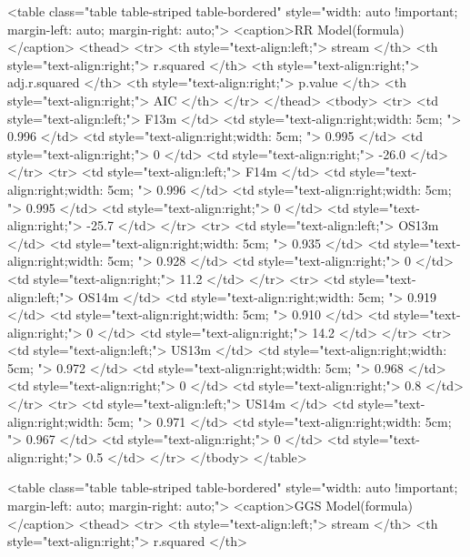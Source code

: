\documentclass[
]{article}
\begin{document}
\begin{table}[!htb]
    \begin{minipage}{.5\linewidth}
      \caption{}
      \centering <table class="table table-striped table-bordered" style="width: auto !important; margin-left: auto; margin-right: auto;">
<caption>RR Model(formula)</caption>
 <thead>
  <tr>
   <th style="text-align:left;"> stream </th>
   <th style="text-align:right;"> r.squared </th>
   <th style="text-align:right;"> adj.r.squared </th>
   <th style="text-align:right;"> p.value </th>
   <th style="text-align:right;"> AIC </th>
  </tr>
 </thead>
<tbody>
  <tr>
   <td style="text-align:left;"> F13m </td>
   <td style="text-align:right;width: 5cm; "> 0.996 </td>
   <td style="text-align:right;width: 5cm; "> 0.995 </td>
   <td style="text-align:right;"> 0 </td>
   <td style="text-align:right;"> -26.0 </td>
  </tr>
  <tr>
   <td style="text-align:left;"> F14m </td>
   <td style="text-align:right;width: 5cm; "> 0.996 </td>
   <td style="text-align:right;width: 5cm; "> 0.995 </td>
   <td style="text-align:right;"> 0 </td>
   <td style="text-align:right;"> -25.7 </td>
  </tr>
  <tr>
   <td style="text-align:left;"> OS13m </td>
   <td style="text-align:right;width: 5cm; "> 0.935 </td>
   <td style="text-align:right;width: 5cm; "> 0.928 </td>
   <td style="text-align:right;"> 0 </td>
   <td style="text-align:right;"> 11.2 </td>
  </tr>
  <tr>
   <td style="text-align:left;"> OS14m </td>
   <td style="text-align:right;width: 5cm; "> 0.919 </td>
   <td style="text-align:right;width: 5cm; "> 0.910 </td>
   <td style="text-align:right;"> 0 </td>
   <td style="text-align:right;"> 14.2 </td>
  </tr>
  <tr>
   <td style="text-align:left;"> US13m </td>
   <td style="text-align:right;width: 5cm; "> 0.972 </td>
   <td style="text-align:right;width: 5cm; "> 0.968 </td>
   <td style="text-align:right;"> 0 </td>
   <td style="text-align:right;"> 0.8 </td>
  </tr>
  <tr>
   <td style="text-align:left;"> US14m </td>
   <td style="text-align:right;width: 5cm; "> 0.971 </td>
   <td style="text-align:right;width: 5cm; "> 0.967 </td>
   <td style="text-align:right;"> 0 </td>
   <td style="text-align:right;"> 0.5 </td>
  </tr>
</tbody>
</table> \end{minipage}%
    \begin{minipage}{.5\linewidth}
      \centering
        \caption{} <table class="table table-striped table-bordered" style="width: auto !important; margin-left: auto; margin-right: auto;">
<caption>GGS Model(formula)</caption>
 <thead>
  <tr>
   <th style="text-align:left;"> stream </th>
   <th style="text-align:right;"> r.squared </th>

\end{minipage}
\end{table}
\end{document}
